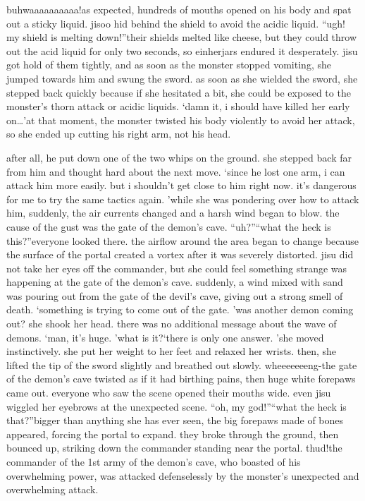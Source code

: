 buhwaaaaaaaaaa!as expected, hundreds of mouths opened on his body and spat out a sticky liquid.
 jisoo hid behind the shield to avoid the acidic liquid.
“ugh! my shield is melting down!”their shields melted like cheese, but they could throw out the acid liquid for only two seconds, so einherjars endured it desperately.
jisu got hold of them tightly, and as soon as the monster stopped vomiting, she jumped towards him and swung the sword.
as soon as she wielded the sword, she stepped back quickly because if she hesitated a bit, she could be exposed to the monster’s thorn attack or acidic liquids.
‘damn it, i should have killed her early on…’at that moment, the monster twisted his body violently to avoid her attack, so she ended up cutting his right arm, not his head.

after all, he put down one of the two whips on the ground.
 she stepped back far from him and thought hard about the next move.
‘since he lost one arm, i can attack him more easily.
 but i shouldn’t get close to him right now.
 it’s dangerous for me to try the same tactics again.
’while she was pondering over how to attack him, suddenly, the air currents changed and a harsh wind began to blow.
 the cause of the gust was the gate of the demon’s cave.
“uh?”“what the heck is this?”everyone looked there.
 the airflow around the area began to change because the surface of the portal created a vortex after it was severely distorted.
jisu did not take her eyes off the commander, but she could feel something strange was happening at the gate of the demon’s cave.
suddenly, a wind mixed with sand was pouring out from the gate of the devil’s cave, giving out a strong smell of death.
‘something is trying to come out of the gate.
’was another demon coming out? she shook her head.
 there was no additional message about the wave of demons.
‘man, it’s huge.
’what is it?‘there is only one answer.
’she moved instinctively.
 she put her weight to her feet and relaxed her wrists.
 then, she lifted the tip of the sword slightly and breathed out slowly.
wheeeeeeeng-the gate of the demon’s cave twisted as if it had birthing pains, then huge white forepaws came out.
 everyone who saw the scene opened their mouths wide.
even jisu wiggled her eyebrows at the unexpected scene.
“oh, my god!”“what the heck is that?”bigger than anything she has ever seen, the big forepaws made of bones appeared, forcing the portal to expand.
 they broke through the ground, then bounced up, striking down the commander standing near the portal.
thud!the commander of the 1st army of the demon’s cave, who boasted of his overwhelming power, was attacked defenselessly by the monster’s unexpected and overwhelming attack.
